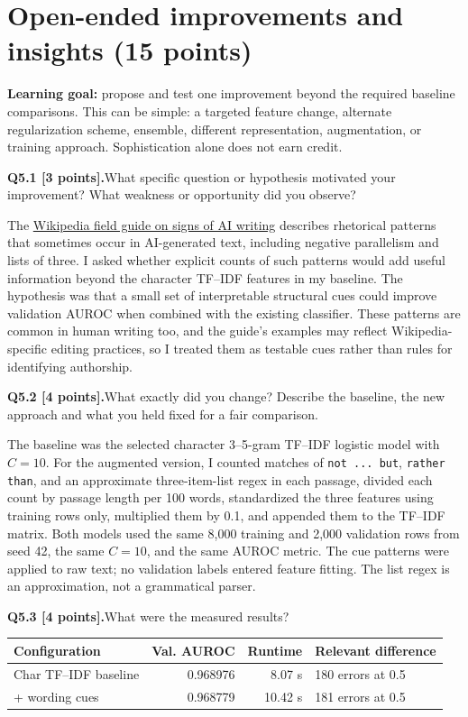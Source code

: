 \documentclass[11pt,letterpaper]{article}
\newcommand{\question}[2]{\needspace{4\baselineskip}\par\addvspace{0.45em}\noindent\textbf{#1}\quad #2\par\nobreak\vspace{0.1em}}
\begin{document}
\newpage
\section{Open-ended improvements and insights (15 points)}
\textbf{Learning goal:} propose and test one improvement beyond the required baseline comparisons. This can be simple: a targeted feature change, alternate regularization scheme, ensemble, different representation, augmentation, or training approach. Sophistication alone does not earn credit.

\question{Q5.1 [3 points].}{What specific question or hypothesis motivated your improvement? What weakness or opportunity did you observe?}
The \href{https://en.wikipedia.org/wiki/Wikipedia:Signs_of_AI_writing}{Wikipedia field guide on signs of AI writing} describes rhetorical patterns that sometimes occur in AI-generated text, including negative parallelism and lists of three. I asked whether explicit counts of such patterns would add useful information beyond the character TF--IDF features in my baseline. The hypothesis was that a small set of interpretable structural cues could improve validation AUROC when combined with the existing classifier. These patterns are common in human writing too, and the guide's examples may reflect Wikipedia-specific editing practices, so I treated them as testable cues rather than rules for identifying authorship.
\question{Q5.2 [4 points].}{What exactly did you change? Describe the baseline, the new approach and what you held fixed for a fair comparison.}
The baseline was the selected character 3--5-gram TF--IDF logistic model with $C=10$. For the augmented version, I counted matches of \texttt{not ... but}, \texttt{rather than}, and an approximate three-item-list regex in each passage, divided each count by passage length per 100 words, standardized the three features using training rows only, multiplied them by 0.1, and appended them to the TF--IDF matrix. Both models used the same 8,000 training and 2,000 validation rows from seed 42, the same $C=10$, and the same AUROC metric. The cue patterns were applied to raw text; no validation labels entered feature fitting. The list regex is an approximation, not a grammatical parser.
\question{Q5.3 [4 points].}{What were the measured results?}
\begin{tabularx}{\linewidth}{@{}YrrY@{}}\toprule Configuration & Val. AUROC & Runtime & Relevant difference \\ \midrule Char TF--IDF baseline & 0.968976 & 8.07 s & 180 errors at 0.5 \\ + wording cues & 0.968779 & 10.42 s & 181 errors at 0.5 \\ \bottomrule\end{tabularx}
\end{document}
